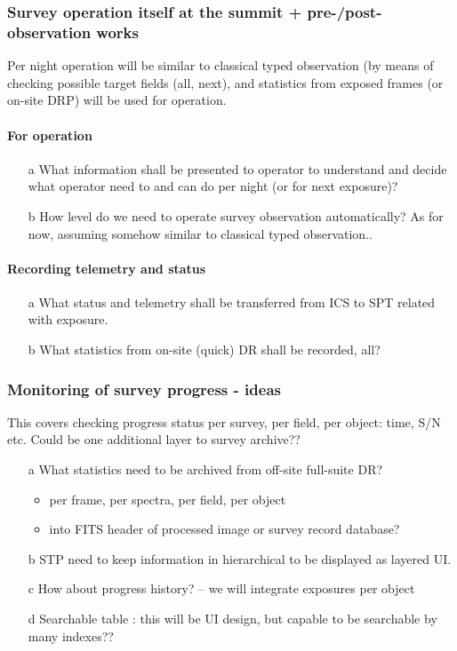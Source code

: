 \documentclass[a4paper,notitlepage]{article}
\begin{document}
\subsubsection{Survey operation itself at the summit + pre-/post- observation works}

Per night operation will be similar to classical typed observation
(by means of checking possible target fields (all, next), 
and statistics from exposed frames (or on-site DRP) will be used for 
operation. 

\paragraph{For operation}

\begin{enumerate}
  \item[a] What information shall be presented to operator to understand and 
    decide what operator need to and can do per night (or for next exposure)?
  \item[b] How level do we need to operate survey observation automatically?
    As for now, assuming somehow similar to classical typed observation..
\end{enumerate}

\paragraph{Recording telemetry and status}

\begin{enumerate}
  \item[a] What status and telemetry shall be transferred from ICS to SPT 
    related with exposure.
  \item[b] What statistics from on-site (quick) DR shall be recorded, all?
\end{enumerate}

\subsubsection{Monitoring of survey progress - ideas}

This covers checking progress status per survey, per field, per object: 
time, S/N etc. Could be one additional layer to survey archive??

\begin{enumerate}
  \item[a] What statistics need to be archived from off-site full-suite DR?
    \begin{itemize}
      \item per frame, per spectra, per field, per object
      \item into FITS header of processed image or survey record database?
    \end{itemize}
  \item[b] STP need to keep information in hierarchical to be displayed as layered UI.
  \item[c] How about progress history? -- we will integrate exposures per object
  \item[d] Searchable table : this will be UI design, but capable to be searchable 
    by many indexes??
\end{enumerate}
\end{document}
